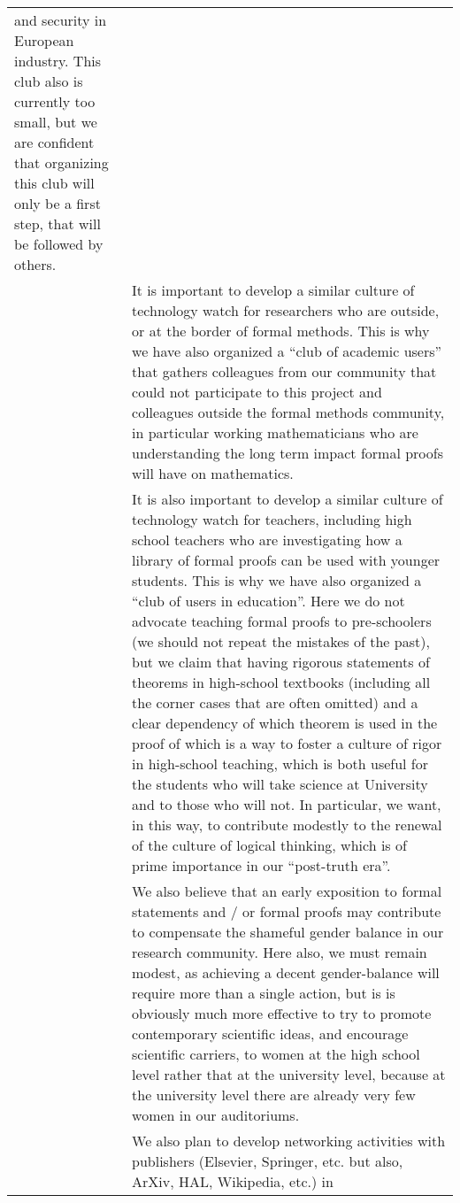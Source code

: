 \begin{longtable}{|p{}|p{}|}
and security in European industry. This club also is currently too
small, but we are confident that organizing this club will only be a
first step, that will be followed by others.\\
&
\hspace{0.4cm}
It is important to develop a similar culture of technology watch for
researchers who are outside, or at the border of formal methods.  This
is why we have also organized a ``club of academic users'' that
gathers colleagues from our community that could not participate to
this project and colleagues outside the formal methods community, in
particular working mathematicians who are understanding the long term
impact formal proofs will have on mathematics.\\
&
\hspace{0.4cm}
It is also important to develop a similar culture of technology watch
for teachers, including high school teachers who are investigating how
a library of formal proofs can be used with younger students.  This is
why we have also organized a ``club of users in education''.  Here we
do not advocate teaching formal proofs to pre-schoolers (we should not
repeat the mistakes of the past), but we claim that having rigorous
statements of theorems in high-school textbooks (including all the
corner cases that are often omitted) and a clear dependency of which
theorem is used in the proof of which is a way to foster a culture of
rigor in high-school teaching, which is both useful for the students
who will take science at University and to those who will not. In
particular, we want, in this way, to contribute modestly to the
renewal of the culture of logical thinking, which is of prime
importance in our ``post-truth era''.\\
&
\hspace{0.4cm}
We also believe that an early exposition to formal statements and / or
formal proofs may contribute to compensate the shameful gender balance
in our research community. Here also, we must remain modest, as
achieving a decent gender-balance will require more than a single
action, but is is obviously much more effective to try to promote
contemporary scientific ideas, and encourage scientific carriers, to
women at the high school level rather that at the university level,
because at the university level there are already very few women in
our auditoriums.\\
&
\hspace{0.4cm}
We also plan to develop networking activities with publishers
(Elsevier, Springer, etc. but also, ArXiv, HAL, Wikipedia, etc.)  in

\end{longtable}
